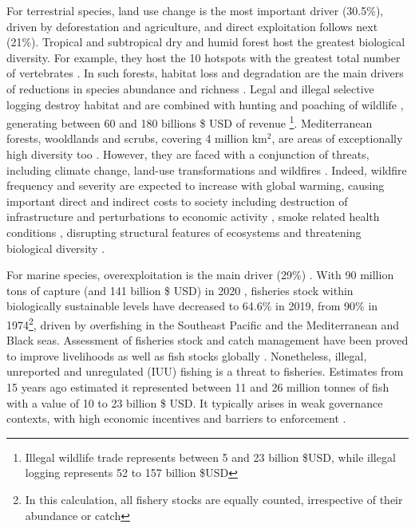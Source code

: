For terrestrial species, land use change is the most important driver (30.5\%), driven by deforestation and agriculture, and direct exploitation follows next (21\%). 
Tropical and subtropical dry and humid forest host the greatest biological diversity. For example, they host the 10 hotspots with the greatest total number of vertebrates \citep{mittermeier_global_2011}. In such forests, habitat loss and degradation are the main drivers of reductions in species abundance and richness \citep{newbold_global_2014}. Legal and illegal selective logging destroy habitat \citep{hoare2022establishing,  bousfield_2023_large} and are combined with hunting and poaching of wildlife \citep{gallego_2020_combined}, generating between 60 and 180  billions  \$ USD of revenue \citep{gfi_2017}\footnote{Illegal wildlife trade represents between 5 and 23 billion \$USD, while illegal logging represents 52 to 157 billion \$USD}. Mediterranean forests, wooldlands and scrubs, covering 4 million km$^2$, are areas of exceptionally high diversity too \citep{Mooney2001, blondel_2010}. However, they are faced with a conjunction of threats, including climate change, land-use transformations \citep{newbold_tropical_2020} and wildfires \citep{Dupuy2019ClimateCI}. Indeed, wildfire frequency and severity are expected to increase with global warming, causing important direct and indirect costs to society including destruction of infrastructure and perturbations to economic activity \citep{wang_economic_2021}, smoke related health conditions \citep{burke_wildfire_2023, heft-neal_behavior_2023}, disrupting structural features of ecosystems \citep{Ayars2023} and threatening biological diversity \citep{Wintle2020}.

For marine species, overexploitation is the main driver (29\%) \citep{ipbes_2022_6417333}. With 90 million tons of capture (and 141 billion \$ USD) in 2020 \citep{fao_2022_state}, fisheries stock within biologically sustainable levels have decreased to 64.6\% in 2019, from 90\% in 1974\footnote{ In this calculation, all fishery stocks are equally counted, irrespective of their abundance or catch}, driven by overfishing in the Southeast Pacific and the Mediterranean and Black seas. Assessment of fisheries stock and catch management have been proved to improve livelihoods as well as fish stocks globally \citep{melnychuk_2017_fisheries, hilborn_2020_effective}. Nonetheless, illegal, unreported and unregulated (IUU) fishing is a threat to fisheries. Estimates from 15 years ago \citep{agnew_estimating_2009} estimated it represented between 11 and 26 million tonnes of fish with a value of 10 to 23 billion \$ USD. It typically arises in weak governance contexts, with high economic incentives and barriers to enforcement \citep{iuu_2020_widjaja}. 

